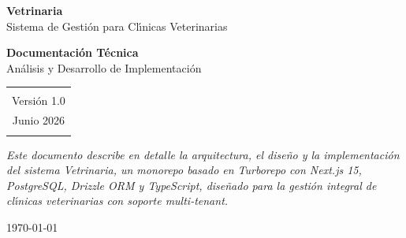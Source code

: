 \begin{titlepage}
\centering

\vspace*{2cm}

{\Huge\textbf{Vetrinaria}}\\[0.8cm]
{\LARGE Sistema de Gesti\'on para Cl\'{\i}nicas Veterinarias}\\[1.5cm]

\vspace{0.5cm}

{\large\textbf{Documentaci\'on T\'ecnica}}\\[0.3cm]
{\large An\'alisis y Desarrollo de Implementaci\'on}\\[1.5cm]

\vspace{1cm}

\begin{tabular}{c}
\hline
\rule{0pt}{1.5cm} \\
{\large Versi\'on 1.0} \\
{\large Junio 2026} \\
\rule{0pt}{1.5cm} \\
\hline
\end{tabular}

\vspace{2cm}

\begin{minipage}{0.8\textwidth}
\centering
\small\textit{Este documento describe en detalle la arquitectura, el dise\~no y la implementaci\'on
del sistema Vetrinaria, un monorepo basado en Turborepo con Next.js 15,
PostgreSQL, Drizzle ORM y TypeScript, dise\~nado para la gesti\'on integral
de cl\'{\i}nicas veterinarias con soporte multi-tenant.}
\end{minipage}

\vfill

{\small \today}
\end{titlepage}
